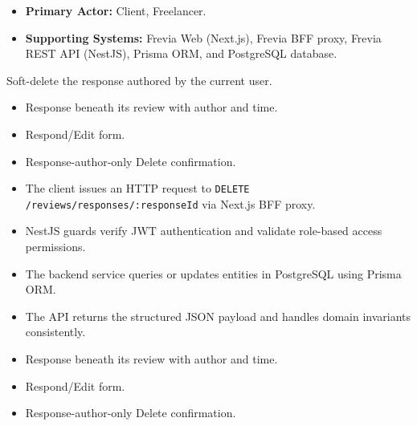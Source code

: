 
\begin{itemize}[leftmargin=1.6em,topsep=3pt,itemsep=2pt,parsep=0pt,label=$\bullet$]
    \item \textbf{Primary Actor:} Client, Freelancer.
    \item \textbf{Supporting Systems:} Frevia Web (Next.js), Frevia BFF proxy, Frevia REST API (NestJS), Prisma ORM, and PostgreSQL database.
\end{itemize}

\noindent Soft-delete the response authored by the current user.

\begin{itemize}[leftmargin=1.6em,topsep=3pt,itemsep=2pt,parsep=0pt,label=$\bullet$]
    \item Response beneath its review with author and time.
    \item Respond/Edit form.
    \item Response-author-only Delete confirmation.
\end{itemize}

\begin{itemize}[leftmargin=1.6em,topsep=3pt,itemsep=2pt,parsep=0pt,label=$\bullet$]
    \item The client issues an HTTP request to \texttt{DELETE /\allowbreak{}reviews/\allowbreak{}responses/\allowbreak{}:\allowbreak{}responseId} via Next.js BFF proxy.
    \item NestJS guards verify JWT authentication and validate role-based access permissions.
    \item The backend service queries or updates entities in PostgreSQL using Prisma ORM.
    \item The API returns the structured JSON payload and handles domain invariants consistently.
\end{itemize}

\begin{itemize}[leftmargin=1.6em,topsep=3pt,itemsep=2pt,parsep=0pt,label=$\bullet$]
    \item Response beneath its review with author and time.
    \item Respond/Edit form.
    \item Response-author-only Delete confirmation.
\end{itemize}

